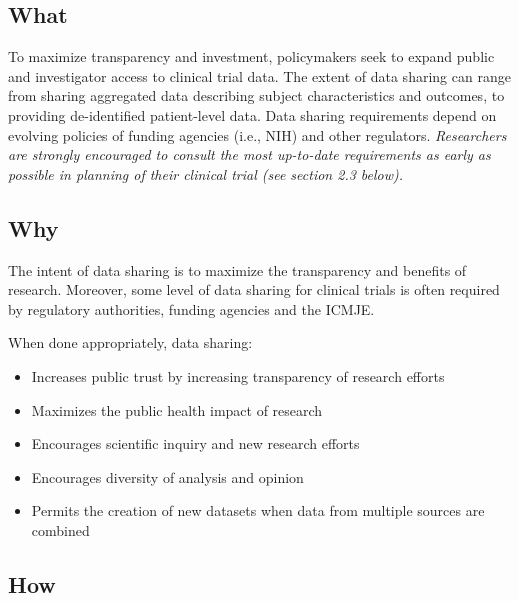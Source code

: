 \documentclass[]{book}
\providecommand{\tightlist}{%
  \setlength{\itemsep}{0pt}\setlength{\parskip}{0pt}}
\begin{document}
\subsection{What}\label{what-19}

To maximize transparency and investment, policymakers seek to expand
public and investigator access to clinical trial data. The extent of
data sharing can range from sharing aggregated data describing subject
characteristics and outcomes, to providing de-identified patient-level
data. Data sharing requirements depend on evolving policies of funding
agencies (i.e., NIH) and other regulators. \emph{Researchers are
strongly encouraged to consult the most up-to-date requirements as early
as possible in planning of their clinical trial (see section 2.3
below).}

\subsection{Why}\label{why-19}

The intent of data sharing is to maximize the transparency and benefits
of research. Moreover, some level of data sharing for clinical trials is
often required by regulatory authorities, funding agencies and the
ICMJE.

When done appropriately, data sharing:

\begin{itemize}
\tightlist
\item
  Increases public trust by increasing transparency of research efforts
\item
  Maximizes the public health impact of research
\item
  Encourages scientific inquiry and new research efforts
\item
  Encourages diversity of analysis and opinion
\item
  Permits the creation of new datasets when data from multiple sources
  are combined
\end{itemize}

\subsection{How}\label{how-19}
\end{document}
